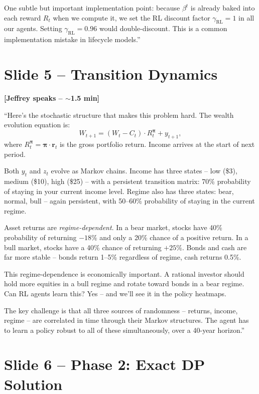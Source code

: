 \documentclass[11pt, letterpaper]{article}
\begin{document}
One subtle but important implementation point: because $\beta^t$ is already baked into each reward $R_t$ when we compute it, we set the RL discount factor $\gamma_{\text{RL}} = 1$ in all our agents. Setting $\gamma_{\text{RL}} = 0.96$ would double-discount. This is a common implementation mistake in lifecycle models.''

\section{Slide 5 -- Transition Dynamics}

\textbf{[Jeffrey speaks -- $\sim$1.5 min]}

``Here's the stochastic structure that makes this problem hard. The wealth evolution equation is:
\[
W_{t+1} = (W_t - C_t) \cdot R_t^{\boldsymbol{\pi}} + y_{t+1},
\]
where $R_t^{\boldsymbol{\pi}} = \boldsymbol{\pi} \cdot \mathbf{r}_t$ is the gross portfolio return. Income arrives at the start of next period.

Both $y_t$ and $z_t$ evolve as Markov chains. Income has three states -- low (\$3), medium (\$10), high (\$25) -- with a persistent transition matrix: 70\% probability of staying in your current income level. Regime also has three states: bear, normal, bull -- again persistent, with 50--60\% probability of staying in the current regime.

Asset returns are \emph{regime-dependent}. In a bear market, stocks have 40\% probability of returning $-18\%$ and only a 20\% chance of a positive return. In a bull market, stocks have a 40\% chance of returning $+25\%$. Bonds and cash are far more stable -- bonds return 1--5\% regardless of regime, cash returns 0.5\%.

This regime-dependence is economically important. A rational investor should hold more equities in a bull regime and rotate toward bonds in a bear regime. Can RL agents learn this? Yes -- and we'll see it in the policy heatmaps.

The key challenge is that all three sources of randomness -- returns, income, regime -- are correlated in time through their Markov structures. The agent has to learn a policy robust to all of these simultaneously, over a 40-year horizon.''

\section{Slide 6 -- Phase 2: Exact DP Solution}
\end{document}
